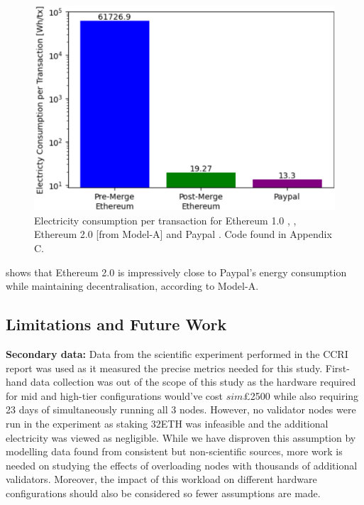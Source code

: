 \begin{figure}[!htb]
    \includegraphics[width=13cm,center]{Figures/PaypalEthElectrcityPlot.png}
    \caption{Electricity consumption per transaction for Ethereum 1.0 \cite{CCRIIndices}, \cite{EthereumBlockchair}, Ethereum 2.0 [from Model-A] and Paypal \cite{2007IntroductionPayPal}. Code found in Appendix C.}
    \label{Figure:PaypalEthElectrcityPlot}
\end{figure}

 shows that Ethereum 2.0 is impressively close to Paypal's energy consumption while maintaining decentralisation, according to Model-A.



\subsection{Limitations and Future Work}
\label{LimitationsFutureWork}

\textbf{Secondary data:} Data from the scientific experiment performed in the CCRI report \cite{CryptoCarbonRatingsInstitute2022TheNetwork} was used as it measured the precise metrics needed for this study. First-hand data collection was out of the scope of this study as the hardware required for mid and high-tier configurations would've cost $sim$£2500 while also requiring 23 days of simultaneously running all 3 nodes. However, no validator nodes were run in the experiment as staking 32ETH was infeasible and the additional electricity was viewed as negligible. While we have disproven this assumption by modelling data found from consistent but non-scientific sources, more work is needed on studying the effects of overloading nodes with thousands of additional validators. Moreover, the impact of this workload on different hardware configurations should also be considered so fewer assumptions are made. 


